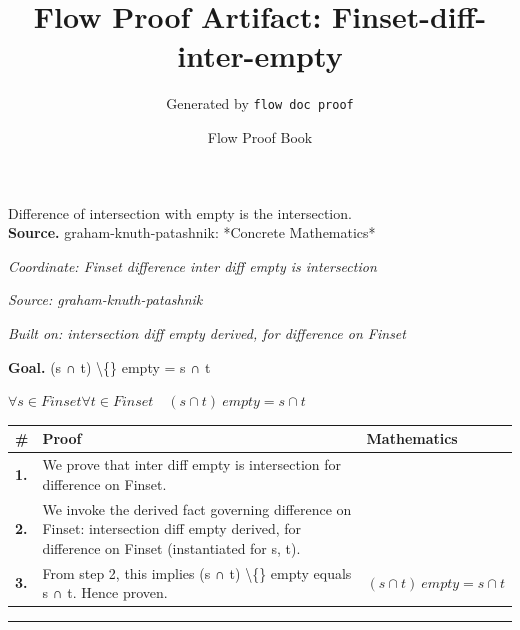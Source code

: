 \documentclass[11pt]{article}
\title{Flow Proof Artifact: Finset-diff-inter-empty}
\author{Generated by \texttt{flow doc proof}}
\date{Flow Proof Book}
\theoremstyle{definition}
\begin{document}
\maketitle
Difference of intersection with empty is the intersection.\\[0.5em]
\textbf{Source.} graham-knuth-patashnik: *Concrete Mathematics*\\[0.5em]
\bigskip
{}\par
\smallskip\noindent\textit{Coordinate: Finset \cdot difference \cdot inter diff empty is intersection}\par
\smallskip\noindent\textit{Source: graham-knuth-patashnik}\par
\smallskip\noindent\textit{Built on: intersection diff empty derived, for difference on Finset}\par
\medskip
\noindent\textbf{Goal.} (s ∩ t) \textbackslash\{\} empty = s ∩ t\par
\noindent$\displaystyle \forall s \in Finset \forall t \in Finset\quad (s ∩ t) \ empty = s ∩ t$\par
\medskip
\noindent
\begin{tabular}{@{} >{\raggedright\arraybackslash}p{} >{\raggedright\arraybackslash}p{} >{\raggedleft\arraybackslash}p{} @{}}
\textbf{\#} & \textbf{Proof} & \textbf{Mathematics} \\
\midrule
\textbf{1.} & We prove that inter diff empty is intersection for difference on Finset. & \\[0.45em]
\textbf{2.} & We invoke the derived fact governing difference on Finset: intersection diff empty derived, for difference on Finset (instantiated for s, t). & \\[0.45em]
\textbf{3.} & From step 2, this implies (s ∩ t) \textbackslash\{\} empty equals s ∩ t. Hence proven. & $\displaystyle (s ∩ t) \ empty = s ∩ t$ \\[0.45em]
\bottomrule
\end{tabular}
\label{thm:Finset-difference-inter_diff_empty_is_intersection}
\par\medskip\hrule
\end{document}
